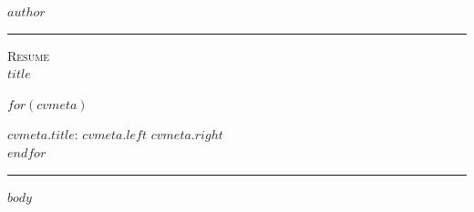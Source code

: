 \documentclass[11pt,A4]{article}
\newcommand{\metasection}[2]
{
\footnotesize{#2} \hspace*{\fill} \footnotesize{#1}\\[1pt]
}
\newcommand{\mystrut}{\rule[-.3\baselineskip]{0pt}{\baselineskip}}
\begin{document}
\pagestyle{fancy}

\vspace{-8pt}
\begin{center}
	\HUGE \textsc{$author$} \textcolor{sectcol}{\rule[-1mm]{1mm}{0.9cm}} \textsc{Resume}\\[2pt]
	\small $title$
\end{center}

\vspace{6pt}

$for(cvmeta)$
\metasection{$cvmeta.right$}{\textbf{$cvmeta.title$}: $cvmeta.left$}
$endfor$

\vspace{-2pt}
\textcolor{softcol}{\hrule}
\vspace{6pt}

\normalsize

\vspace{-6pt}
$body$


\null
\vspace*{\fill}
\hspace{-0.25\linewidth}\colorbox{white}{\makebox[1.5\linewidth][c]{\mystrut  \textnormal{\textcolor{sectcol}{$cvfooter.left$}  *  \textcolor{sectcol}{$cvfooter.right$}}}}
\end{document}
